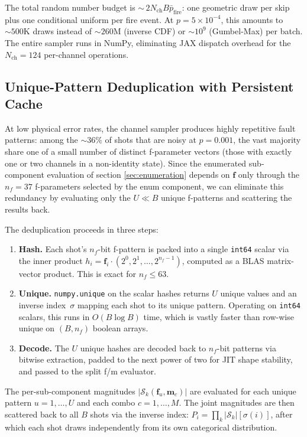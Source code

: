 \documentclass[a4paper,onecolumn,11pt,accepted=2026-06-10]{quantumarticle}
\begin{document}
The total random number budget is ${\sim}\,2 N_{\mathrm{ch}} B \bar{p}_{\mathrm{fire}}$: one geometric draw per skip plus one conditional uniform per fire event. At $p = 5 \times 10^{-4}$, this amounts to ${\sim}500\text{K}$ draws instead of ${\sim}260\text{M}$ (inverse CDF) or ${\sim}10^9$ (Gumbel-Max) per batch. The entire sampler runs in NumPy, eliminating JAX dispatch overhead for the $N_{\mathrm{ch}} = 124$ per-channel operations.

\subsection{Unique-Pattern Deduplication with Persistent Cache}
\label{sec:dedup}

At low physical error rates, the channel sampler produces highly repetitive fault patterns: among the ${\sim}36\%$ of shots that are noisy at $p = 0.001$, the vast majority share one of a small number of distinct f-parameter vectors (those with exactly one or two channels in a non-identity state). Since the enumerated sub-component evaluation of section \ref{sec:enumeration} depends on $\mathbf{f}$ only through the $n_f = 37$ f-parameters selected by the enum component, we can eliminate this redundancy by evaluating only the $U \ll B$ unique f-patterns and scattering the results back.

The deduplication proceeds in three steps:
\begin{enumerate}
    \item \textbf{Hash.} Each shot's $n_f$-bit f-pattern is packed into
          a single \texttt{int64} scalar via the inner product
          $h_i = \mathbf{f}_i \cdot (2^0, 2^1, \ldots, 2^{n_f - 1})$,
          computed as a BLAS matrix-vector product. This is exact for
          $n_f \leq 63$.
    \item \textbf{Unique.} \texttt{numpy.unique} on the scalar hashes
          returns $U$ unique values and an inverse index~$\sigma$ mapping
          each shot to its unique pattern. Operating on \texttt{int64}
          scalars, this runs in $O(B \log B)$ time, which is vastly faster than
          row-wise unique on $(B, n_f)$ boolean arrays.
    \item \textbf{Decode.} The $U$ unique hashes are decoded back to
          $n_f$-bit patterns via bitwise extraction, padded to the next
          power of two for JIT shape stability, and passed to the split
          f/m evaluator.
\end{enumerate}
The per-sub-component magnitudes $|\mathcal{S}_k(\mathbf{f}_u, \mathbf{m}_c)|$ are evaluated for each unique pattern $u = 1, \ldots, U$ and each combo $c = 1, \ldots, M$. The joint magnitudes are then scattered back to all $B$ shots via the inverse index: $P_i = \prod_k |\mathcal{S}_k|[\sigma(i)]$, after which each shot draws independently from its own categorical distribution.
\end{document}
